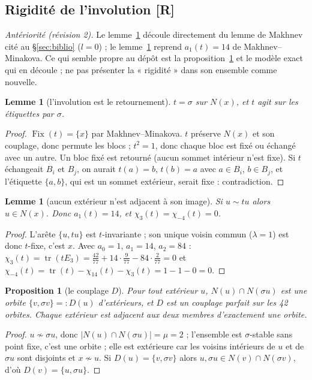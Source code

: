 \documentclass[11pt,a4paper]{article}
\newtheorem{proposition}[theorem]{Proposition}
\newtheorem{lemma}[theorem]{Lemme}
\theoremstyle{definition}
\theoremstyle{remark}
\newcommand{\Fix}{\operatorname{Fix}}
\newcommand{\tr}{\operatorname{tr}}
\newcommand{\st}[1]{\textbf{[#1]}}
\begin{document}
\subsection{Rigidité de l'involution \st{R}}
\noindent\emph{Antériorité (révision 2).} Le lemme~\ref{lem:flip} découle directement du lemme de Makhnev cité au §\ref{sec:biblio} ($l=0$) ; le lemme~\ref{lem:noself}
reprend $a_1(t)=14$ de Makhnev--Minakova. Ce qui semble propre au dépôt est la proposition~\ref{prop:D} et le modèle exact qui en découle ; ne pas présenter
la « rigidité » dans son ensemble comme nouvelle.
\begin{lemma}[l'involution est le retournement]\label{lem:flip}
$t=\sigma$ sur $N(x)$, et $t$ agit sur les étiquettes par $\sigma$.
\end{lemma}
\begin{proof}
$\Fix(t)=\{x\}$ par Makhnev--Minakova. $t$ préserve $N(x)$ et son couplage, donc permute les blocs ; $t^2=1$, donc chaque bloc est fixé ou échangé avec un autre.
Un bloc fixé est retourné (aucun sommet intérieur n'est fixe). Si $t$ échangeait $B_i$ et $B_j$, on aurait $t(a)=b$, $t(b)=a$ avec $a\in B_i$, $b\in B_j$, et l'étiquette
$\{a,b\}$, qui est un sommet extérieur, serait fixe : contradiction.
\end{proof}

\begin{lemma}[aucun extérieur n'est adjacent à son image]\label{lem:noself}
Si $u\sim tu$ alors $u\in N(x)$. Donc $a_1(t)=14$, et $\chi_3(t)=\chi_{-4}(t)=0$.
\end{lemma}
\begin{proof}
L'arête $\{u,tu\}$ est $t$-invariante ; son unique voisin commun ($\lambda=1$) est donc $t$-fixe, c'est $x$. Avec $a_0=1$, $a_1=14$, $a_2=84$ :
$\chi_3(t)=\tr(tE_3)=\tfrac{42}{77}+14\cdot\tfrac{9}{77}-84\cdot\tfrac{2}{77}=0$ et $\chi_{-4}(t)=\tr(t)-\chi_{14}(t)-\chi_3(t)=1-1-0=0$.
\end{proof}

\begin{proposition}[le couplage $D$]\label{prop:D}
Pour tout extérieur $u$, $N(u)\cap N(\sigma u)$ est une orbite $\{v,\sigma v\}=:D(u)$ d'extérieurs, et $D$ est un couplage parfait sur les 42 orbites.
Chaque extérieur est adjacent aux deux membres d'exactement une orbite.
\end{proposition}
\begin{proof}
$u\not\sim\sigma u$, donc $|N(u)\cap N(\sigma u)|=\mu=2$ ; l'ensemble est $\sigma$-stable sans point fixe, c'est une orbite ; elle est extérieure car les voisins
intérieurs de $u$ et de $\sigma u$ sont disjoints et $x\not\sim u$. Si $D(u)=\{v,\sigma v\}$ alors $u,\sigma u\in N(v)\cap N(\sigma v)$, d'où $D(v)=\{u,\sigma u\}$.
\end{proof}
\end{document}
